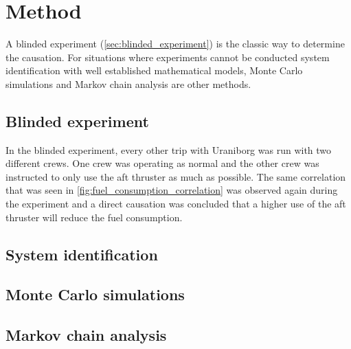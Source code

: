 \documentclass[fleqn,10pt]{olplainarticle}
\begin{document}
\section{Method}
A blinded experiment (\autoref{sec:blinded_experiment}) is the classic way to determine the causation. For situations where experiments cannot be conducted system identification with well established
mathematical models, Monte Carlo simulations and Markov chain analysis are other methods.

\subsection{Blinded experiment}\label{sec:blinded_experiment}
In the blinded experiment, every other trip with Uraniborg was run with two different crews. One crew was operating as normal and the other crew was instructed to only use the aft thruster as much as possible. The same correlation that was seen in \autoref{fig:fuel_consumption_correlation} was observed again during the experiment and a direct causation was concluded that a higher use of the aft thruster will reduce the fuel consumption.

\subsection{System identification}
\subsection{Monte Carlo simulations}
\subsection{Markov chain analysis}


\end{document}
